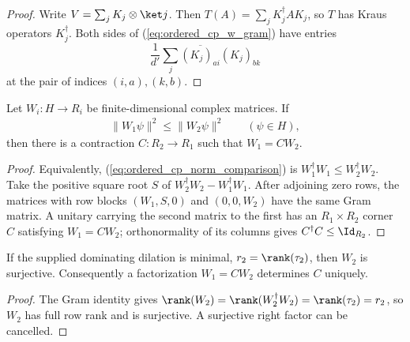 \begin{proof}\leanok
    Write $V=\sum_jK_j\otimes\ket j$. Then
    $T(A)=\sum_jK_j^\dagger A K_j$, so $T$ has Kraus operators
    $K_j^\dagger$. Both sides of
    (\ref{eq:ordered_cp_w_gram}) have entries
    \[
        \frac1{d'}\sum_j
        \overline{(K_j)_{a i}}(K_j)_{b k}
    \]
    at the pair of indices $(i,a),(k,b)$.
\end{proof}

\begin{lemma}
    \label{lem:ordered_cp_rectangular_contraction_factorization}
    \leanok
    Let $W_i:H\to R_i$ be finite-dimensional complex matrices. If
    \begin{align}
        \lVert W_1\psi\rVert^2
        \leq \lVert W_2\psi\rVert^2
        \qquad(\psi\in H),
        \label{eq:ordered_cp_norm_comparison}
    \end{align}
    then there is a contraction $C:R_2\to R_1$ such that
    $W_1=CW_2$.
\end{lemma}

\begin{proof}\leanok
    Equivalently, (\ref{eq:ordered_cp_norm_comparison}) is
    $W_1^\dagger W_1\leq W_2^\dagger W_2$. Take the positive square root
    $S$ of $W_2^\dagger W_2-W_1^\dagger W_1$. After adjoining zero rows,
    the matrices with row blocks $(W_1,S,0)$ and $(0,0,W_2)$ have the
    same Gram matrix. A unitary carrying the second matrix to the first
    has an $R_1\times R_2$ corner $C$ satisfying $W_1=CW_2$; orthonormality
    of its columns gives $C^\dagger C\leq\Id_{R_2}$.
\end{proof}

\begin{lemma}
    \label{lem:ordered_cp_minimal_w_surjective}
    \leanok
    If the supplied dominating dilation is minimal,
    $r_2=\rank(\tau_2)$, then $W_2$ is surjective. Consequently a
    factorization $W_1=CW_2$ determines $C$ uniquely.
\end{lemma}

\begin{proof}\leanok
    The Gram identity gives
    $\rank(W_2)=\rank(W_2^\dagger W_2)=\rank(\tau_2)=r_2$, so $W_2$ has
    full row rank and is surjective. A surjective right factor can be
    cancelled.
\end{proof}

